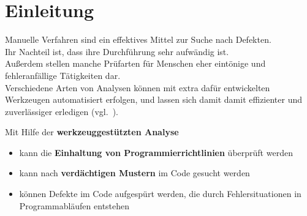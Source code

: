 \section{Einleitung}

Manuelle Verfahren sind ein effektives Mittel zur Suche nach Defekten.\\
Ihr Nachteil ist, dass ihre Durchführung sehr aufwändig ist.\\
Außerdem stellen manche Prüfarten für Menschen eher eintönige und fehleranfällige Tätigkeiten dar.\\

\noindent
Verschiedene Arten von Analysen können mit extra dafür entwickelten Werkzeugen automatisiert erfolgen, und lassen sich damit damit effizienter und zuverlässiger erledigen (vgl.~\cite[27]{Wed09c}).

\noindent
Mit Hilfe der \textbf{werkzeuggestützten Analyse}

\begin{itemize}
    \item kann die \textbf{Einhaltung von Programmierrichtlinien} überprüft werden
    \item kann nach \textbf{verdächtigen Mustern} im Code gesucht werden
    \item können Defekte im Code aufgespürt werden, die durch Fehlersituationen in Programmabläufen entstehen
\end{itemize}
